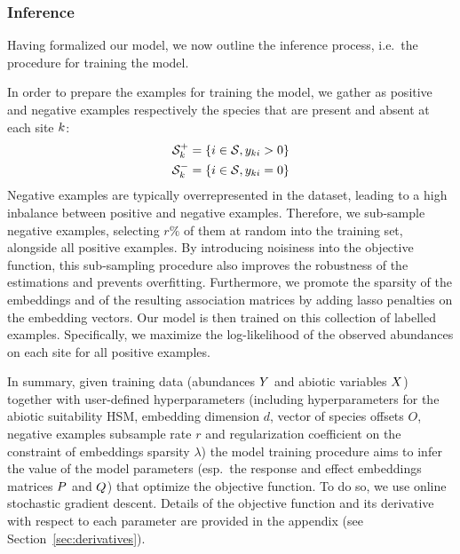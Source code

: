 \documentclass[10pt,a4paper]{article}
\begin{document}
\subsubsection{Inference}
Having formalized our model, we now outline the inference process, i.e.\ the procedure for training the model.

In order to prepare the examples for training the model, we gather as positive and negative examples respectively the species that are present and absent at each site $k$:
\begin{align*}
\mathcal{S}_{k}^+ &= \{i \in \mathcal{S}, y_{ki}>0\} \\ 
\mathcal{S}_{k}^- &= \{i \in \mathcal{S}, y_{ki}=0\}
\end{align*}
Negative examples are typically overrepresented in the dataset, leading to a high inbalance between positive and negative examples. Therefore, we sub-sample negative examples, selecting $r \%$ of them at random into the training set, alongside all positive examples. By introducing noisiness into the objective function, this sub-sampling procedure also improves the robustness of the estimations and prevents overfitting. Furthermore, we promote the sparsity of the embeddings and of the resulting association matrices by adding lasso penalties on the embedding vectors. 
Our model is then trained on this collection of labelled examples. Specifically, we maximize the log-likelihood  of the observed abundances on each site for all positive examples. 

In summary, given training data (abundances $Y$ and abiotic variables $X$) together with user-defined hyperparameters (including hyperparameters for the abiotic suitability HSM, embedding dimension $d$, vector of species offsets $O$, negative examples subsample rate $r$ and regularization coefficient on the constraint of embeddings sparsity $\lambda$) the model training procedure aims to infer the value of the model parameters (esp.\ the response and effect embeddings matrices $P$ and $Q$) that optimize the objective function. To do so, we use online stochastic gradient descent. Details of the objective function and its derivative with respect to each parameter are provided in the appendix (see Section~\ref{sec:derivatives}).
\end{document}
